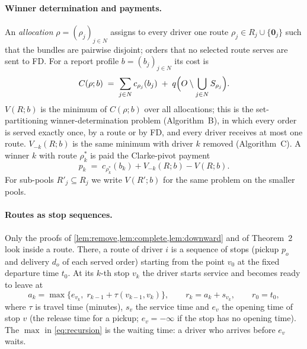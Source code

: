\documentclass[11pt]{article}
\theoremstyle{definition}
\theoremstyle{remark}
\newcommand{\idle}{\mathbf{0}}
\begin{document}
\paragraph{Winner determination and payments.}
An \emph{allocation} $\rho=(\rho_j)_{j\in N}$ assigns to every driver one route
$\rho_j\in R_j\cup\{\idle_j\}$ such that the bundles are pairwise disjoint;
orders that no selected route serves are sent to FD. For a report profile
$b=(b_j)_{j\in N}$ its cost is
\begin{equation}\label{eq:alloccost}
C(\rho;b)\;=\;\sum_{j\in N}c_{\rho_j}(b_j)\;+\;q\Bigl(O\setminus\bigcup_{j\in N}S_{\rho_j}\Bigr).
\end{equation}
$V(R;b)$ is the minimum of $C(\rho;b)$ over all allocations; this is the
set-partitioning winner-determination problem (Algorithm~B), in which every
order is served exactly once, by a route or by FD, and every driver receives at
most one route. $V_{-k}(R;b)$ is the same minimum with driver $k$ removed
(Algorithm~C). A winner $k$ with route $\rho^*_k$ is paid the Clarke-pivot
payment
\begin{equation}\label{eq:payment}
p_k\;=\;c_{\rho^*_k}(b_k)+V_{-k}(R;b)-V(R;b).
\end{equation}
For sub-pools $R'_j\subseteq R_j$ we write $V(R';b)$ for the same problem on
the smaller pools.

\paragraph{Routes as stop sequences.}
Only the proofs of \cref{lem:remove,lem:complete,lem:downward} and of
Theorem~2 look inside a route. There, a route of driver $i$ is a
sequence of stops (pickup $p_o$ and delivery $d_o$ of each served order)
starting from the point $v_0$ at the fixed departure time $t_0$. At its
$k$-th stop $v_k$ the driver starts service and becomes ready to leave at
\begin{equation}\label{eq:recursion}
a_k=\max\bigl\{e_{v_k},\;r_{k-1}+\tau(v_{k-1},v_k)\bigr\},\qquad
r_k=a_k+s_{v_k},\qquad r_0=t_0,
\end{equation}
where $\tau$ is travel time (minutes), $s_v$ the service time and $e_v$ the
opening time of stop $v$ (the release time for a pickup; $e_v=-\infty$ if the
stop has no opening time). The $\max$ in \eqref{eq:recursion} is the waiting
time: a driver who arrives before $e_v$ waits.
\end{document}
